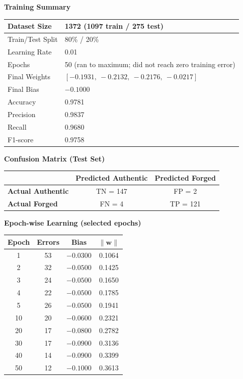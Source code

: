 \documentclass[11pt]{article}
\begin{document}
\textbf{Training Summary}

\begin{tabular}{|p{6cm}|p{7cm}|}
\hline
Dataset Size & 1372 (1097 train / 275 test)\\
\hline
Train/Test Split & 80\% / 20\%\\
\hline
Learning Rate & 0.01\\
\hline
Epochs & 50 (ran to maximum; did not reach zero training error)\\
\hline
Final Weights & $[-0.1931,\ -0.2132,\ -0.2176,\ -0.0217]$\\
\hline
Final Bias & $-0.1000$\\
\hline
Accuracy & 0.9781\\
\hline
Precision & 0.9837\\
\hline
Recall & 0.9680\\
\hline
F1-score & 0.9758\\
\hline
\end{tabular}

\vspace{10mm}
\textbf{Confusion Matrix (Test Set)}

\begin{tabular}{|l|c|c|}
\hline
 & \textbf{Predicted Authentic} & \textbf{Predicted Forged}\\
\hline
\textbf{Actual Authentic} & TN = 147 & FP = 2\\
\hline
\textbf{Actual Forged} & FN = 4 & TP = 121\\
\hline
\end{tabular}

\vspace{10mm}

\textbf{Epoch-wise Learning (selected epochs)}

\begin{tabular}{|c|c|c|c|}
\hline
Epoch & Errors & Bias & $\lVert \mathbf{w} \rVert$\\
\hline
1  & 53 & $-0.0300$ & 0.1064\\
\hline
2  & 32 & $-0.0500$ & 0.1425\\
\hline
3  & 24 & $-0.0500$ & 0.1650\\
\hline
4  & 22 & $-0.0500$ & 0.1785\\
\hline
5  & 26 & $-0.0500$ & 0.1941\\
\hline
10 & 20 & $-0.0600$ & 0.2321\\
\hline
20 & 17 & $-0.0800$ & 0.2782\\
\hline
30 & 17 & $-0.0900$ & 0.3136\\
\hline
40 & 14 & $-0.0900$ & 0.3399\\
\hline
50 & 12 & $-0.1000$ & 0.3613\\
\hline
\end{tabular}
\end{document}
